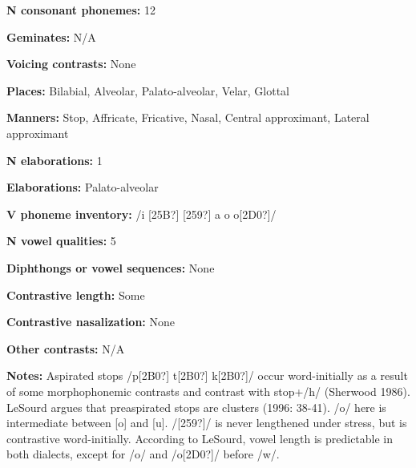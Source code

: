 \begin{styleBody}
\textbf{N consonant phonemes:} 12
\end{styleBody}

\begin{styleBody}
\textbf{Geminates:} N/A
\end{styleBody}

\begin{styleBody}
\textbf{Voicing contrasts:} None
\end{styleBody}

\begin{styleBody}
\textbf{Places:} Bilabial, Alveolar, Palato-alveolar, Velar, Glottal
\end{styleBody}

\begin{styleBody}
\textbf{Manners:} Stop, Affricate, Fricative, Nasal, Central approximant, Lateral approximant
\end{styleBody}

\begin{styleBody}
\textbf{N elaborations:} 1
\end{styleBody}

\begin{styleBody}
\textbf{Elaborations:} Palato-alveolar
\end{styleBody}

\begin{styleBody}
\textbf{V phoneme inventory:} /i [25B?] [259?] a o o[2D0?]/
\end{styleBody}

\begin{styleBody}
\textbf{N vowel qualities:} 5
\end{styleBody}

\begin{styleBody}
\textbf{Diphthongs or vowel sequences:} None
\end{styleBody}

\begin{styleBody}
\textbf{Contrastive length:} Some
\end{styleBody}

\begin{styleBody}
\textbf{Contrastive nasalization:} None
\end{styleBody}

\begin{styleBody}
\textbf{Other contrasts:} N/A
\end{styleBody}

\begin{styleBody}
\textbf{Notes:} Aspirated stops /p[2B0?] t[2B0?] k[2B0?]/ occur word-initially as a result of some morphophonemic contrasts and contrast with stop+/h/ (Sherwood 1986). LeSourd argues that preaspirated stops are clusters (1996: 38-41). /o/ here is intermediate between [o] and [u]. /[259?]/ is never lengthened under stress, but is contrastive word-initially. According to LeSourd, vowel length is predictable in both dialects, except for /o/ and /o[2D0?]/ before /w/.
\end{styleBody}

